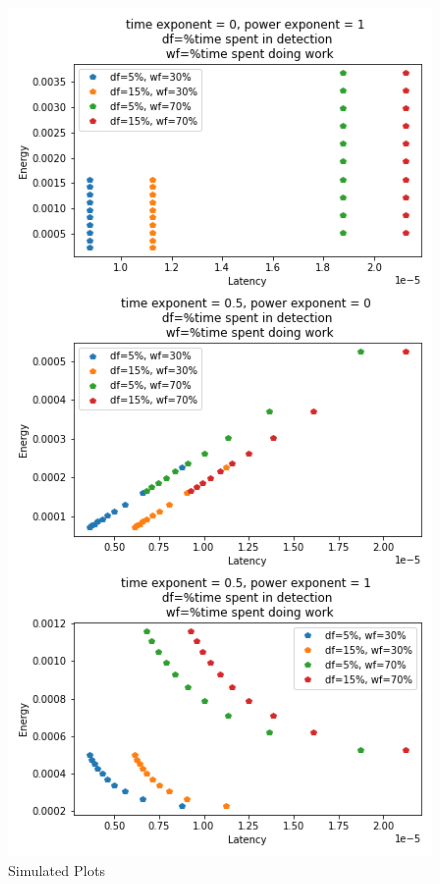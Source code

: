 \begin{figure}
\centering
\includegraphics[width=.8\columnwidth]{figures/model_plots}
\caption[]{Simulated Plots}
\label{fig:simplots}
\vspace{-0.28in}
\end{figure}

